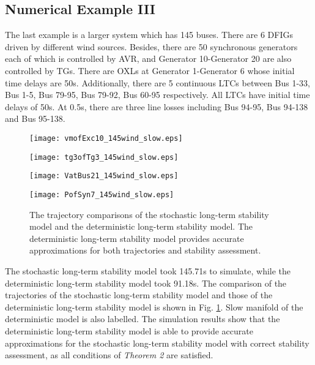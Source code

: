 \documentclass[journal]{IEEEtran}
\begin{document}
\subsection{Numerical Example III}
The last example is a larger system which has 145 buses\cite{testcasearchive}.  There are 6 DFIGs driven by different wind sources. Besides, there are 50 synchronous generators each of which is controlled by AVR, and Generator 10-Generator 20 are also controlled by TGs. There are OXLs at Generator 1-Generator 6 whose initial time delays are 50s. Additionally, there are 5 continuous LTCs between Bus 1-33, Bus 1-5, Bus 79-95, Bus 79-92, Bus 60-95 respectively. All LTCs have initial time delays of 50s. At 0.5s, there are three line losses including Bus 94-95, Bus 94-138 and Bus 95-138. 
\begin{figure}[!ht]
\centering
\begin{minipage}[t]{0.5\linewidth}
\texttt{[image: vmofExc10\_145wind\_slow.eps]}
\end{minipage}\begin{minipage}[t]{0.5\linewidth}
\texttt{[image: tg3ofTg3\_145wind\_slow.eps]}
\end{minipage}
\begin{minipage}[t]{0.5\linewidth}
\texttt{[image: VatBus21\_145wind\_slow.eps]}
\end{minipage}\begin{minipage}[t]{0.5\linewidth}
\texttt{[image: PofSyn7\_145wind\_slow.eps]}
\end{minipage}
\caption{The trajectory comparisons of the stochastic long-term stability model and the deterministic long-term stability model. The deterministic long-term stability model provides accurate approximations for both trajectories and stability assessment.}\label{my145wind}
\end{figure}


The stochastic long-term stability model took 145.71s to simulate, while the deterministic long-term stability model took 91.18s. The comparison of the trajectories of the stochastic long-term stability model and those of the deterministic long-term stability model is shown in Fig. \ref{my145wind}. Slow manifold of the deterministic model is also labelled. The simulation results show that the deterministic long-term stability model is able to provide accurate approximations for the stochastic long-term stability model with correct stability assessment, as all conditions of \textit{Theorem 2} are satisfied.
\end{document}
